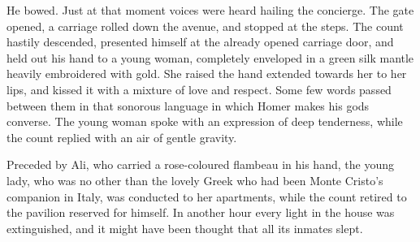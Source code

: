  He bowed. Just at that moment voices were heard hailing the concierge. The gate opened, a carriage rolled down the avenue, and stopped at the steps. The count hastily descended, presented himself at the already opened carriage door, and held out his hand to a young woman, completely enveloped in a green silk mantle heavily embroidered with gold. She raised the hand extended towards her to her lips, and kissed it with a mixture of love and respect. Some few words passed between them in that sonorous language in which Homer makes his gods converse. The young woman spoke with an expression of deep tenderness, while the count replied with an air of gentle gravity. 

 Preceded by Ali, who carried a rose-coloured flambeau in his hand, the young lady, who was no other than the lovely Greek who had been Monte Cristo's companion in Italy, was conducted to her apartments, while the count retired to the pavilion reserved for himself. In another hour every light in the house was extinguished, and it might have been thought that all its inmates slept. 